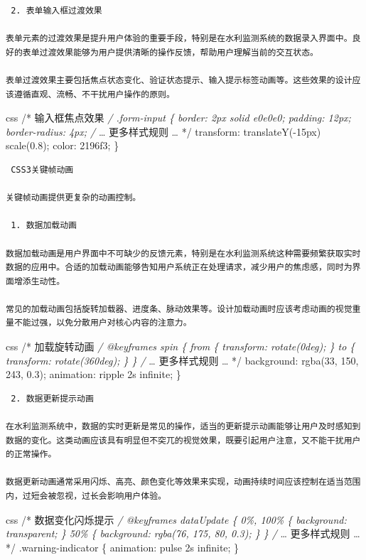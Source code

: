 \begin{lstlisting}
 2. 表单输入框过渡效果

表单元素的过渡效果是提升用户体验的重要手段，特别是在水利监测系统的数据录入界面中。良好的表单过渡效果能够为用户提供清晰的操作反馈，帮助用户理解当前的交互状态。

表单过渡效果主要包括焦点状态变化、验证状态提示、输入提示标签动画等。这些效果的设计应该遵循直观、流畅、不干扰用户操作的原则。
\end{lstlisting}

css /* 输入框焦点效果 \emph{/ .form-input \{ border: 2px solid e0e0e0; padding: 12px; border-radius: 4px; /} \ldots{} 更多样式规则 \ldots{} */ transform: translateY(-15px) scale(0.8); color: 2196f3; \}

\begin{lstlisting}
 CSS3关键帧动画

关键帧动画提供更复杂的动画控制。

 1. 数据加载动画

数据加载动画是用户界面中不可缺少的反馈元素，特别是在水利监测系统这种需要频繁获取实时数据的应用中。合适的加载动画能够告知用户系统正在处理请求，减少用户的焦虑感，同时为界面增添生动性。

常见的加载动画包括旋转加载器、进度条、脉动效果等。设计加载动画时应该考虑动画的视觉重量不能过强，以免分散用户对核心内容的注意力。
\end{lstlisting}

css /* 加载旋转动画 \emph{/ @keyframes spin \{ from \{ transform: rotate(0deg); \} to \{ transform: rotate(360deg); \} \} /} \ldots{} 更多样式规则 \ldots{} */ background: rgba(33, 150, 243, 0.3); animation: ripple 2s infinite; \}

\begin{lstlisting}
 2. 数据更新提示动画

在水利监测系统中，数据的实时更新是常见的操作，适当的更新提示动画能够让用户及时感知到数据的变化。这类动画应该具有明显但不突兀的视觉效果，既要引起用户注意，又不能干扰用户的正常操作。

数据更新动画通常采用闪烁、高亮、颜色变化等效果来实现，动画持续时间应该控制在适当范围内，过短会被忽视，过长会影响用户体验。
\end{lstlisting}

css /* 数据变化闪烁提示 \emph{/ @keyframes dataUpdate \{ 0\%, 100\% \{ background: transparent; \} 50\% \{ background: rgba(76, 175, 80, 0.3); \} \} /} \ldots{} 更多样式规则 \ldots{} */ .warning-indicator \{ animation: pulse 2s infinite; \}

